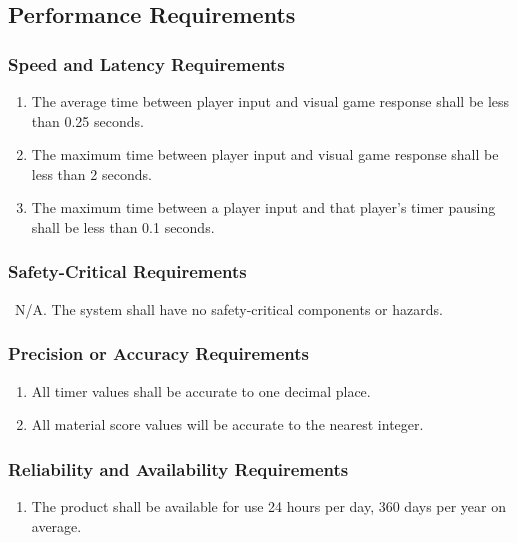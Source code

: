 \documentclass[]{article}
\begin{document}
\subsection{Performance Requirements}
\label{sub:performance_requirements}

\subsubsection{Speed and Latency Requirements}
\label{ssub:speed_and_latency_requirements}
\begin{enumerate}[{PR}1., leftmargin=2\parindent]
	\item The average time between player input and visual game response shall be less than 0.25 seconds.
	\item The maximum time between player input and visual game response shall be less than 2 seconds.
	\item The maximum time between a player input and that player's timer pausing shall be less than 0.1 seconds.
\end{enumerate}

\subsubsection{Safety-Critical Requirements}
\label{ssub:safety_critical_requirements}
\ N/A. The system shall have no safety-critical components or hazards.

\subsubsection{Precision or Accuracy Requirements}
\label{ssub:precision_or_accuracy_requirements}
\begin{enumerate}[{PR}1., leftmargin=2\parindent, resume]
	\item All timer values shall be accurate to one decimal place.
	\item All material score values will be accurate to the nearest integer.
\end{enumerate}

\subsubsection{Reliability and Availability Requirements}
\label{ssub:reliability_and_availability_requirements}
\begin{enumerate}[{PR}1., leftmargin=2\parindent, resume]
	\item The product shall be available for use 24 hours per day, 360 days per year on average.
\end{enumerate}
\end{document}
